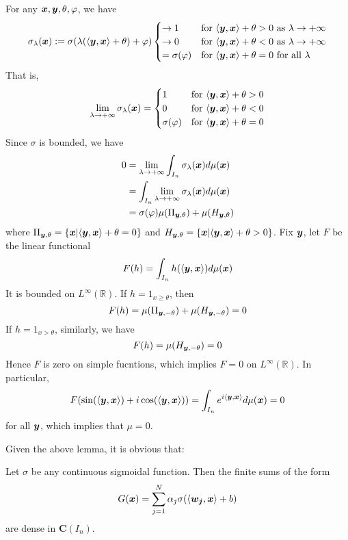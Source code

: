 \begin{pf}
    For any $\boldsymbol{x}, \boldsymbol{y}, \theta, \varphi$, we have
    \begin{equation*}
        \sigma_\lambda(\boldsymbol{x}) := \sigma(\lambda(\langle \boldsymbol{y}, \boldsymbol{x}\rangle + \theta) + \varphi)
        \begin{cases}
            \to 1 & \text{for $\langle \boldsymbol{y}, \boldsymbol{x}\rangle + \theta > 0$ as $\lambda \to +\infty$}\\
            \to 0 & \text{for $\langle \boldsymbol{y}, \boldsymbol{x}\rangle + \theta < 0$ as $\lambda \to +\infty$}\\
            = \sigma(\varphi) & \text{for $\langle \boldsymbol{y}, \boldsymbol{x}\rangle + \theta = 0$ for all $\lambda$}
        \end{cases}
    \end{equation*}
    That is, 
    \begin{equation*}
        \lim_{\lambda \to +\infty} \sigma_{\lambda}(\boldsymbol{x}) =
        \begin{cases}
            1 & \text{for $\langle \boldsymbol{y}, \boldsymbol{x}\rangle + \theta > 0$}\\
            0 & \text{for $\langle \boldsymbol{y}, \boldsymbol{x}\rangle + \theta < 0$}\\
            \sigma(\varphi) & \text{for $\langle \boldsymbol{y}, \boldsymbol{x}\rangle + \theta = 0$}
        \end{cases}
    \end{equation*}
    Since $\sigma$ is bounded, we have
    \begin{align*}
        0 &= \lim_{\lambda \to +\infty} \int_{I_n} \sigma_\lambda(\boldsymbol{x}) d\mu(\boldsymbol{x})\\
          &= \int_{I_n} \lim_{\lambda \to +\infty}\sigma_\lambda(\boldsymbol{x}) d\mu(\boldsymbol{x})\\
          &= \sigma(\varphi) \mu(\Pi_{\boldsymbol{y}, \theta}) + \mu(H_{\boldsymbol{y}, \theta})
    \end{align*}
    where $\Pi_{\boldsymbol{y}, \theta} = \{\boldsymbol{x} | \langle \boldsymbol{y}, \boldsymbol{x}\rangle + \theta = 0\}$ and 
    $H_{\boldsymbol{y}, \theta} = \{\boldsymbol{x} | \langle \boldsymbol{y}, \boldsymbol{x}\rangle + \theta > 0\}$. Fix $\boldsymbol{y}$, let $F$ be the 
    linear functional
    $$F(h) = \int_{I_n} h(\langle \boldsymbol{y}, \boldsymbol{x}\rangle) d\mu(\boldsymbol{x})$$
    It is bounded on $L^\infty(\mathbb{R})$. If $h = 1_{x \geqslant \theta}$, then
    $$F(h) = \mu(\Pi_{\boldsymbol{y}, -\theta}) + \mu(H_{\boldsymbol{y}, -\theta}) = 0$$
    If $h = 1_{x > \theta}$, similarly, we have
    $$F(h) = \mu(H_{\boldsymbol{y}, -\theta}) = 0$$
    Hence $F$ is zero on simple fucntions, which implies $F = 0$ on $L^\infty(\mathbb{R})$. In particular,
    $$F(\sin(\langle {\ensuremath{\boldsymbol{y}}}, {\boldsymbol{x}}\rangle) + i \cos(\langle {\ensuremath{\boldsymbol{y}}}, {\boldsymbol{x}}\rangle)) = \int_{I_n} 
    e^{i\langle {\ensuremath{\boldsymbol{y}}}, {\boldsymbol{x}}\rangle} d\mu(\boldsymbol{x}) = 0$$
    for all $\boldsymbol{y}$, which implies that $\mu = 0$.
\end{pf}

Given the above lemma, it is obvious that:

\begin{thm}
    Let $\sigma$ be any continuous sigmoidal function. Then the finite sums of the form
    \begin{equation}
        G(\boldsymbol{x}) = \sum_{j=1}^N \alpha_j\sigma(\langle \boldsymbol{w_j}, \boldsymbol{x}\rangle + b)
    \end{equation}
    are dense in $\boldsymbol{C}(I_n)$.
\end{thm}